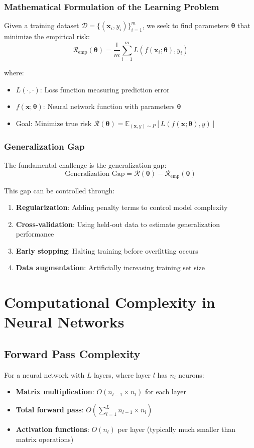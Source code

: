 \subsubsection{Mathematical Formulation of the Learning Problem}
Given a training dataset \(\mathcal{D} = \{(\mathbf{x}_i, y_i)\}_{i=1}^{m}\), we seek to find parameters \(\boldsymbol{\theta}\) that minimize the empirical risk:
\[\mathcal{R}_{\text{emp}}(\boldsymbol{\theta}) = \frac{1}{m} \sum_{i=1}^{m} L(f(\mathbf{x}_i; \boldsymbol{\theta}), y_i)\]

where:
\begin{itemize}
    \item \(L(\cdot, \cdot)\): Loss function measuring prediction error
    \item \(f(\mathbf{x}; \boldsymbol{\theta})\): Neural network function with parameters \(\boldsymbol{\theta}\)
    \item Goal: Minimize true risk \(\mathcal{R}(\boldsymbol{\theta}) = \mathbb{E}_{(\mathbf{x},y) \sim P}[L(f(\mathbf{x}; \boldsymbol{\theta}), y)]\)
\end{itemize}

\subsubsection{Generalization Gap}
The fundamental challenge is the generalization gap:
\[\text{Generalization Gap} = \mathcal{R}(\boldsymbol{\theta}) - \mathcal{R}_{\text{emp}}(\boldsymbol{\theta})\]

This gap can be controlled through:
\begin{enumerate}
    \item \textbf{Regularization}: Adding penalty terms to control model complexity
    \item \textbf{Cross-validation}: Using held-out data to estimate generalization performance
    \item \textbf{Early stopping}: Halting training before overfitting occurs
    \item \textbf{Data augmentation}: Artificially increasing training set size
\end{enumerate}

\section{Computational Complexity in Neural Networks}
\subsection{Forward Pass Complexity}
For a neural network with \(L\) layers, where layer \(l\) has \(n_l\) neurons:
\begin{itemize}
    \item \textbf{Matrix multiplication}: \(O(n_{l-1} \times n_l)\) for each layer
    \item \textbf{Total forward pass}: \(O(\sum_{l=1}^{L} n_{l-1} \times n_l)\)
    \item \textbf{Activation functions}: \(O(n_l)\) per layer (typically much smaller than matrix operations)
\end{itemize}

